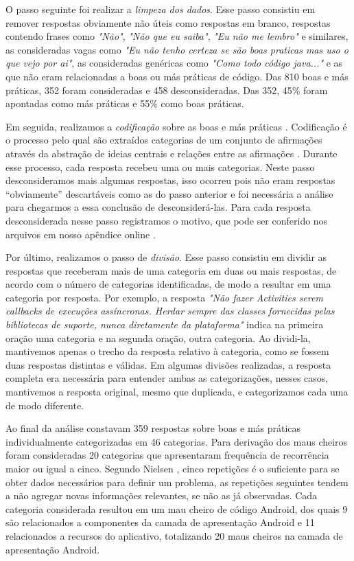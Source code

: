 O passo seguinte foi realizar a \textit{limpeza dos dados}. Esse passo consistiu em remover respostas obviamente não úteis como respostas em branco, respostas contendo frases como \textit{"Não"}, \textit{"Não que eu saiba"}, \textit{"Eu não me lembro"} e similares, as consideradas vagas como \textit{"Eu não tenho certeza se são boas praticas mas uso o que vejo por ai"}, as consideradas genéricas como \textit{"Como todo código java..."} e as que não eram relacionadas a boas ou más práticas de código. Das 810 boas e más práticas, 352 foram consideradas e 458 desconsideradas. Das 352, 45\% foram apontadas como más práticas e 55\% como boas práticas. 

Em seguida, realizamos a \textit{codificação} sobre as boas e más práticas \cite{Strauss2007,Saldana2013}. Codificação é o processo pelo qual são extraídos categorias de um conjunto de afirmações através da abstração de ideias centrais e relações entre as afirmações \cite{Strauss2007}. Durante esse processo, cada resposta recebeu uma ou mais categorias. Neste passo desconsideramos mais algumas respostas, isso ocorreu pois não eram respostas ``obviamente'' descartáveis como as do passo anterior e foi necessária a análise para chegarmos a essa conclusão de desconsiderá-las. Para cada resposta desconsiderada nesse passo registramos o motivo, que pode ser conferido nos arquivos em nosso apêndice online \cite{apendice}.

Por último, realizamos o passo de \textit{divisão}. Esse passo consistiu em dividir as respostas que receberam mais de uma categoria em duas ou mais respostas, de acordo com o número de categorias identificadas, de modo a resultar em uma categoria por resposta. Por exemplo, a resposta \textit{"Não fazer Activities serem callbacks de execuções assíncronas. Herdar sempre das classes fornecidas pelas bibliotecas de suporte, nunca diretamente da plataforma"} indica na primeira oração uma categoria e na segunda oração, outra categoria. Ao dividi-la, mantivemos apenas o trecho da resposta relativo à categoria, como se fossem duas respostas distintas e válidas. Em algumas divisões realizadas, a resposta completa era necessária para entender ambas as categorizações, nesses casos, mantivemos a resposta original, mesmo que duplicada, e categorizamos cada uma de modo diferente. 

Ao final da análise constavam 359 respostas sobre boas e más práticas individualmente categorizadas em 46 categorias. Para derivação dos maus cheiros foram consideradas 20 categorias que apresentaram frequência de recorrência maior ou igual a cinco. Segundo Nielsen \cite{NielsenMagicNumber:00}, cinco repetições é o suficiente para se obter dados necessários para definir um problema, as repetições seguintes tendem a não agregar novas informações relevantes, se não as já observadas. Cada categoria considerada resultou em um mau cheiro de código Android, dos quais 9 são relacionados a componentes da camada de apresentação Android e 11 relacionados a recursos do aplicativo, totalizando 20 maus cheiros na camada de apresentação Android. 





